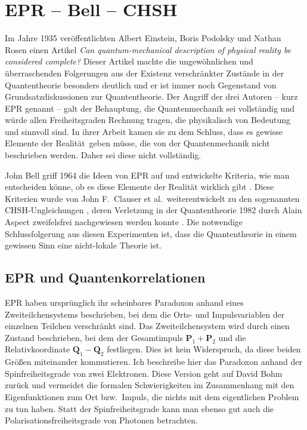 
\chapter{EPR -- Bell -- CHSH}
\label{chap_EPR}


%
Im Jahre 1935 
ver\"offentlichten Albert Einstein,
Boris Podolsky 
und 
Nathan Rosen einen Artikel 
{\em Can quantum-mechanical description of physical
reality be considered complete?} \cite{EPR} Dieser Artikel machte
die ungew\"ohnlichen und \"uberraschenden
Folgerungen aus der Existenz
verschr\"ankter Zu\-st\"ande in der Quantentheorie
besonders deutlich und er ist immer noch
Gegenstand von Grundsatzdiskussionen zur
Quantentheorie. Der Angriff der drei Autoren -- kurz EPR genannt --
galt der Behauptung, die Quantenmechanik sei
vollst\"andig und w\"urde 
allen Freiheitsgraden Rechnung tragen, die
physikalisch von Bedeutung und sinnvoll sind. 
In ihrer Arbeit kamen sie zu dem Schluss, 
dass es gewisse 
\glqq Elemente der Realit\"at\grqq\ geben
m\"usse, die von der Quantenmechanik nicht
beschrieben werden. Daher sei diese nicht
vollst\"andig.

John Bell griff 1964 die Ideen von EPR auf und entwickelte 
Kriteria, wie man entscheiden k\"onne, ob es diese Elemente der
Realit\"at wirklich gibt \cite{Bell4}. Diese Kriterien wurde von John F.\ Clauser et al.\
weiterentwickelt zu den sogenannten CHSH-Ungleichungen \cite{CHSH}, deren
Verletzung in der Quantentheorie 1982 durch Alain Aspect 
zweifelsfrei nachgewiesen werden konnte \cite{Aspect}. Die notwendige
Schlussfolgerung aus diesen Experimenten ist, dass die Quantentheorie
in einem gewissen Sinn eine nicht-lokale Theorie ist.  

\section{EPR und Quantenkorrelationen}
\label{sec_EPR}

EPR haben urspr\"unglich ihr scheinbares Paradoxon
anhand eines Zweiteilchensystems beschrieben, bei dem die
Orts- und Impulsvariablen der einzelnen Teilchen 
verschr\"ankt sind. Das Zwei\-teilchen\-sys\-tem wird durch einen Zustand
beschrieben, bei dem der Gesamtimpuls $\pmb{P}_1+\pmb{P}_2$
und die Relativkoordinate $\pmb{Q}_1-\pmb{Q}_2$ festliegen. Dies ist kein Widerspruch, da diese
beiden Gr\"o\ss en miteinander kommutieren. Ich beschreibe hier
das Paradoxon anhand der Spinfreiheitsgrade von zwei
Elektronen. Diese Version geht auf 
David Bohm zur\"uck
und vermeidet die formalen Schwierigkeiten im Zusammenhang
mit den Eigenfunktionen zum Ort bzw.\ Impuls, die nichts mit
dem eigentlichen Problem zu tun haben. Statt
der Spinfreiheitsgrade kann man ebenso gut
auch die Polarisationsfreiheitsgrade von Photonen
betrachten.

